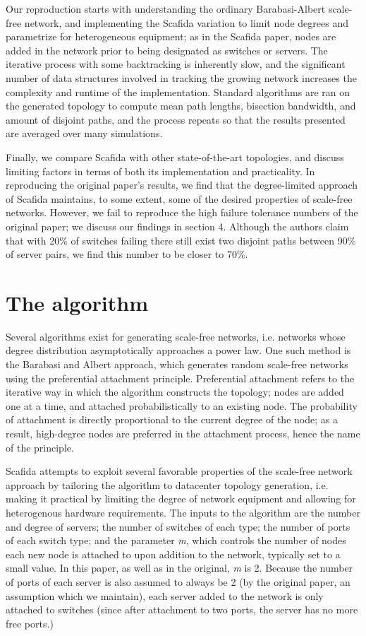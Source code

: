 Our reproduction starts with understanding the ordinary Barabasi-Albert scale-free network, and implementing the Scafida variation to limit node degrees and parametrize for heterogeneous equipment; as in the Scafida paper, nodes are added in the network prior to being designated as switches or servers. The iterative process with some backtracking is inherently slow, and the significant number of data structures involved in tracking the growing network increases the complexity and runtime of the implementation. Standard algorithms are ran on the generated topology to compute mean path lengths, bisection bandwidth, and amount of disjoint paths, and the process repeats so that the results presented are averaged over many simulations.

Finally, we compare Scafida with other state-of-the-art topologies, and discuss limiting factors in terms of both its implementation and practicality. In reproducing the original paper's results, we find that the degree-limited approach of Scafida maintains, to some extent, some of the desired properties of scale-free networks. However, we fail to reproduce the high failure tolerance numbers of the original paper; we discuss our findings in section 4. Although the authors claim that with 20\% of switches failing there still exist two disjoint paths between 90\% of server pairs, we find this number to be closer to 70\%.

\section{The algorithm}
Several algorithms exist for generating scale-free networks, i.e. networks whose degree distribution asymptotically approaches a power law. One such method is the Barabasi and Albert approach, which generates random scale-free networks using the preferential attachment principle. Preferential attachment refers to the iterative way in which the algorithm constructs the topology; nodes are added one at a time, and attached probabilistically to an existing node. The probability of attachment is directly proportional to the current degree of the node; as a result, high-degree nodes are preferred in the attachment process, hence the name of the principle.

Scafida attempts to exploit several favorable properties of the scale-free network approach by tailoring the algorithm to datacenter topology generation, i.e. making it practical by limiting the degree of network equipment and allowing for heterogenous hardware requirements. The inputs to the algorithm are the number and degree of servers; the number of switches of each type; the number of ports of each switch type; and the parameter \textit{m}, which controls the number of nodes each new node is attached to upon addition to the network, typically set to a small value. In this paper, as well as in the original, \textit{m} is 2. Because the number of ports of each server is also assumed to always be 2 (by the original paper, an assumption which we maintain), each server added to the network is only attached to switches (since after attachment to two ports, the server has no more free ports.)

